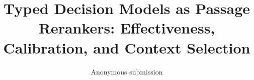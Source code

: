\documentclass[Afour,sagev,times]{sagej}
\begin{document}
\title{Typed Decision Models as Passage Rerankers: Effectiveness, Calibration, and Context Selection}

\author{Anonymous submission}


\begin{abstract}

\end{abstract}


\maketitle











\end{document}
